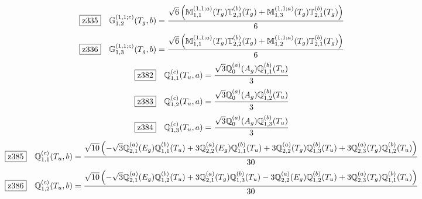 \documentclass[fleqn,10pt,landscape]{jsarticle}
\begin{document}
\begin{dmath*}
\hspace*{3mm}\fbox{z335}\quad \mathbb{G}_{1,2}^{(1,1;c)}(T_{g},b)=\frac{\sqrt{6} \left(\mathbb{M}_{1,1}^{(1,1;a)}(T_{g}) \mathbb{T}_{2,3}^{(b)}(T_{g}) + \mathbb{M}_{1,3}^{(1,1;a)}(T_{g}) \mathbb{T}_{2,1}^{(b)}(T_{g})\right)}{6}
\end{dmath*}
\begin{dmath*}
\hspace*{3mm}\fbox{z336}\quad \mathbb{G}_{1,3}^{(1,1;c)}(T_{g},b)=\frac{\sqrt{6} \left(\mathbb{M}_{1,1}^{(1,1;a)}(T_{g}) \mathbb{T}_{2,2}^{(b)}(T_{g}) + \mathbb{M}_{1,2}^{(1,1;a)}(T_{g}) \mathbb{T}_{2,1}^{(b)}(T_{g})\right)}{6}
\end{dmath*}
\begin{dmath*}
\hspace*{3mm}\fbox{z382}\quad \mathbb{Q}_{1,1}^{(c)}(T_{u},a)=\frac{\sqrt{3} \mathbb{Q}_{0}^{(a)}(A_{g}) \mathbb{Q}_{1,1}^{(b)}(T_{u})}{3}
\end{dmath*}
\begin{dmath*}
\hspace*{3mm}\fbox{z383}\quad \mathbb{Q}_{1,2}^{(c)}(T_{u},a)=\frac{\sqrt{3} \mathbb{Q}_{0}^{(a)}(A_{g}) \mathbb{Q}_{1,2}^{(b)}(T_{u})}{3}
\end{dmath*}
\begin{dmath*}
\hspace*{3mm}\fbox{z384}\quad \mathbb{Q}_{1,3}^{(c)}(T_{u},a)=\frac{\sqrt{3} \mathbb{Q}_{0}^{(a)}(A_{g}) \mathbb{Q}_{1,3}^{(b)}(T_{u})}{3}
\end{dmath*}
\begin{dmath*}
\hspace*{3mm}\fbox{z385}\quad \mathbb{Q}_{1,1}^{(c)}(T_{u},b)=\frac{\sqrt{10} \left(- \sqrt{3} \mathbb{Q}_{2,1}^{(a)}(E_{g}) \mathbb{Q}_{1,1}^{(b)}(T_{u}) + 3 \mathbb{Q}_{2,2}^{(a)}(E_{g}) \mathbb{Q}_{1,1}^{(b)}(T_{u}) + 3 \mathbb{Q}_{2,2}^{(a)}(T_{g}) \mathbb{Q}_{1,3}^{(b)}(T_{u}) + 3 \mathbb{Q}_{2,3}^{(a)}(T_{g}) \mathbb{Q}_{1,2}^{(b)}(T_{u})\right)}{30}
\end{dmath*}
\begin{dmath*}
\hspace*{3mm}\fbox{z386}\quad \mathbb{Q}_{1,2}^{(c)}(T_{u},b)=\frac{\sqrt{10} \left(- \sqrt{3} \mathbb{Q}_{2,1}^{(a)}(E_{g}) \mathbb{Q}_{1,2}^{(b)}(T_{u}) + 3 \mathbb{Q}_{2,1}^{(a)}(T_{g}) \mathbb{Q}_{1,3}^{(b)}(T_{u}) - 3 \mathbb{Q}_{2,2}^{(a)}(E_{g}) \mathbb{Q}_{1,2}^{(b)}(T_{u}) + 3 \mathbb{Q}_{2,3}^{(a)}(T_{g}) \mathbb{Q}_{1,1}^{(b)}(T_{u})\right)}{30}
\end{dmath*}
\end{document}
